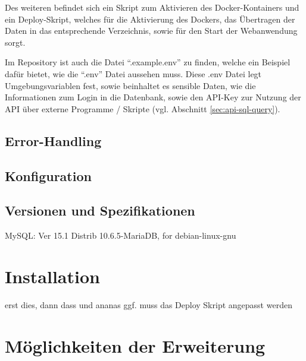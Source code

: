 Des weiteren befindet sich ein Skript zum Aktivieren des Docker-Kontainers und ein Deploy-Skript, welches
für die Aktivierung des Dockers, das Übertragen der Daten in das entsprechende Verzeichnis, sowie für den Start der
Webanwendung sorgt.

Im Repository ist auch die Datei ``.example.env'' zu finden, welche ein Beispiel dafür bietet, wie die ``.env'' Datei
aussehen muss. Diese .env Datei legt Umgebungsvariablen fest, sowie beinhaltet es sensible Daten, wie
die Informationen zum Login in die Datenbank, sowie den API-Key zur Nutzung der API über externe Programme / Skripte
(vgl. Abschnitt \ref{sec:api-sql-query}).



\subsection{Error-Handling}
\label{sec:nodechapter-error-handling}


\subsection{Konfiguration}
\label{sec:nodechapter-implementation-config}




\subsection{Versionen und Spezifikationen}
\label{sec:nodechapter-versions}


MySQL: Ver 15.1 Distrib 10.6.5-MariaDB, for debian-linux-gnu
\newpage
\section{Installation}
\label{sec:nodechapter-installation}
erst dies, dann dass und ananas
ggf. muss das Deploy Skript angepasst werden
\newpage
\section{Möglichkeiten der Erweiterung}
